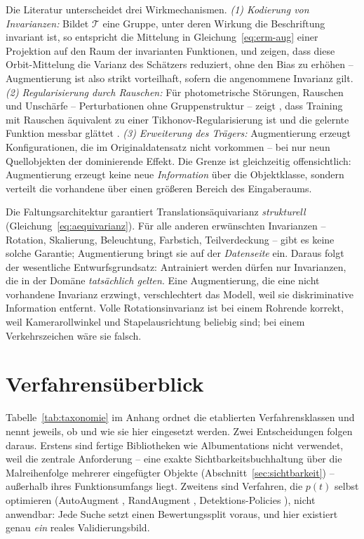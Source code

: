 Die Literatur unterscheidet drei Wirkmechanismen. \emph{(1) Kodierung von
Invarianzen:} Bildet $\mathcal{T}$ eine Gruppe, unter deren Wirkung die
Beschriftung invariant ist, so entspricht die Mittelung in
Gleichung~\eqref{eq:erm-aug} einer Projektion auf den Raum der invarianten
Funktionen, und \textcite{chen2020group} zeigen, dass diese Orbit-Mittelung die
Varianz des Schätzers reduziert, ohne den Bias zu erhöhen -- Augmentierung ist
also strikt vorteilhaft, sofern die angenommene Invarianz gilt.
\emph{(2) Regularisierung durch Rauschen:} Für photometrische Störungen, Rauschen
und Unschärfe -- Perturbationen ohne Gruppenstruktur -- zeigt
\textcite{bishop1995}, dass Training mit Rauschen äquivalent zu einer
Tikhonov-Regularisierung ist und die gelernte Funktion messbar glättet
\parencite[vgl.\ auch][]{dao2019}. \emph{(3) Erweiterung des Trägers:}
Augmentierung erzeugt Konfigurationen, die im Originaldatensatz nicht vorkommen --
bei nur neun Quellobjekten der dominierende Effekt. Die Grenze ist gleichzeitig
offensichtlich: Augmentierung erzeugt keine neue \emph{Information} über die
Objektklasse, sondern verteilt die vorhandene über einen größeren Bereich des
Eingaberaums.

 Die Faltungsarchitektur garantiert
Translationsäquivarianz \emph{strukturell}
(Gleichung~\eqref{eq:aequivarianz}). Für alle anderen erwünschten Invarianzen --
Rotation, Skalierung, Beleuchtung, Farbstich, Teilverdeckung -- gibt es keine
solche Garantie; Augmentierung bringt sie auf der \emph{Datenseite} ein. Daraus
folgt der wesentliche Entwurfsgrundsatz: Antrainiert werden dürfen nur
Invarianzen, die in der Domäne \emph{tatsächlich gelten}. Eine Augmentierung, die
eine nicht vorhandene Invarianz erzwingt, verschlechtert das Modell, weil sie
diskriminative Information entfernt. Volle Rotationsinvarianz ist bei einem
Rohrende korrekt, weil Kamerarollwinkel und Stapelausrichtung beliebig sind; bei
einem Verkehrszeichen wäre sie falsch.

\section{Verfahrensüberblick}
\label{sec:augtaxonomie}

Tabelle~\ref{tab:taxonomie} im Anhang ordnet die etablierten Verfahrensklassen
und nennt jeweils, ob und wie sie hier eingesetzt werden. Zwei Entscheidungen
folgen daraus. Erstens sind fertige Bibliotheken wie Albumentations
\parencite{buslaev2020} nicht verwendet, weil die zentrale Anforderung -- eine
exakte Sichtbarkeitsbuchhaltung über die Malreihenfolge mehrerer eingefügter
Objekte (Abschnitt~\ref{sec:sichtbarkeit}) -- außerhalb ihres Funktionsumfangs
liegt. Zweitens sind Verfahren, die $p(t)$ selbst optimieren (AutoAugment
\parencite{cubuk2019}, RandAugment \parencite{cubuk2020}, Detektions-Policies
\parencite{zoph2020}), nicht anwendbar: Jede Suche setzt einen Bewertungssplit
voraus, und hier existiert genau \emph{ein} reales Validierungsbild.

